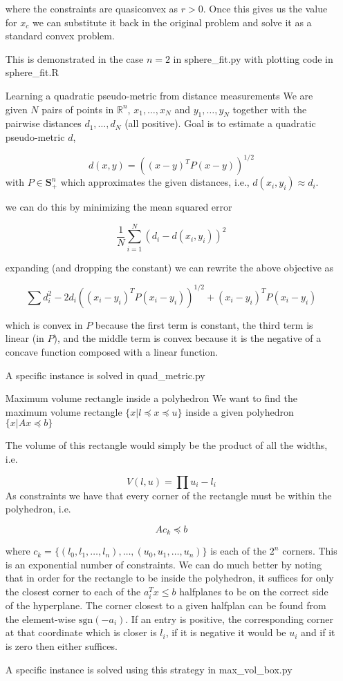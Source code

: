 \documentclass[12pt]{article}
\begin{document}
\begin{itemize}
  where the constraints are quasiconvex as $r > 0$. Once this gives us the value for $x_c$ we can substitute it back in the original problem and solve it as a standard convex problem.

  This is demonstrated in the case $n=2$ in sphere_fit.py with plotting code in sphere_fit.R

\item[Learning a quadratic pseudo-metric from distance measurements]
  We are given $N$ pairs of points in $\mathbb{R}^n$, $x_1, \ldots, x_N$ and $y_1, \ldots, y_N$ together with the pairwise distances $d_1, \ldots, d_N$ (all positive). Goal is to estimate a quadratic pseudo-metric $d$,

  $$d(x,y) = \left( (x-y)^T P (x-y) \right)^{1/2}$$
  with $P \in \textbf{S}_+^n$ which approximates the given distances, i.e., $d(x_i, y_i) \approx d_i$.

  we can do this by minimizing the mean squared error

  $$\frac{1}{N} \sum_{i=1}^N (d_i - d(x_i, y_i))^2$$

  expanding (and dropping the constant) we can rewrite the above objective as

  $$\sum d_i^2 - 2d_i \left( (x_i-y_i)^T P (x_i-y_i) \right)^{1/2} + (x_i-y_i)^T P (x_i-y_i)$$

  which is convex in $P$ because the first term is constant, the third term is linear (in $P$), and the middle term is convex because it is the negative of a concave function composed with a linear function.

  A specific instance is solved in quad_metric.py 
  
\item[Maximum volume rectangle inside a polyhedron]
  We want to find the maximum volume rectangle $\{x | l \preceq x \preceq u\}$ inside a given polyhedron $\{x | Ax \preceq b\}$

  The volume of this rectangle would simply be the product of all the widths, i.e.

  $$V(l, u) = \prod u_i - l_i $$
  As constraints we have that every corner of the rectangle must be within the polyhedron, i.e.

  $$A c_k \preceq b$$

  where $c_k = \{ (l_0, l_1, \ldots, l_n), \ldots, (u_0, u_1, \ldots, u_n) \}$ is each of the $2^n$ corners. This is an exponential number of constraints.
  We can do much better by noting that in order for the rectangle to be inside the polyhedron, it suffices for only the closest corner to each of the $a_i^T x \leq b$ halfplanes to be on the correct side of the hyperplane. The corner closest to a given halfplan can be found from the element-wise $\text{sgn}(-a_i)$. If an entry is positive, the corresponding corner at that coordinate which is closer is $l_i$, if it is negative it would be $u_i$ and if it is zero then either suffices.

  A specific instance is solved using this strategy in max_vol_box.py
  
\end{itemize}
\end{document}
